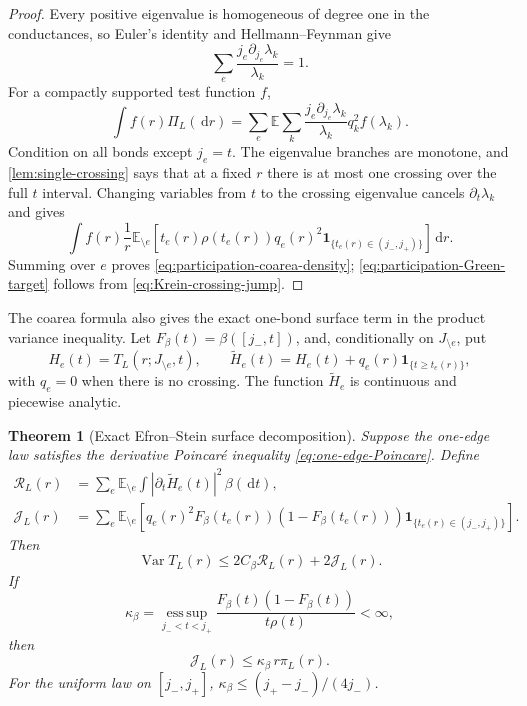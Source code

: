 \documentclass[11pt]{article}
\newtheorem{theorem}{Theorem}[section]
\theoremstyle{definition}
\theoremstyle{remark}
\newcommand{\E}{\mathbb E}
\newcommand{\Var}{\operatorname{Var}}
\newcommand{\abs}[1]{\left\lvert #1\right\rvert}
\newcommand{\dd}{\,\mathrm d}
\begin{document}
\begin{proof}
Every positive eigenvalue is homogeneous of degree one in the conductances, so
Euler's identity and Hellmann--Feynman give
\begin{equation}
 \sum_e\frac{j_e\partial_{j_e}\lambda_k}{\lambda_k}=1.
 \label{eq:eigenvalue-Euler-identity}
\end{equation}
For a compactly supported test function $f$,
\[
 \int f(r)\Pi_L(\dd r)
 =\sum_e\E\sum_k
 \frac{j_e\partial_{j_e}\lambda_k}{\lambda_k}
 q_k^2f(\lambda_k).
\]
Condition on all bonds except $j_e=t$.  The eigenvalue branches are monotone,
and \cref{lem:single-crossing} says that at a fixed $r$ there is at most one
crossing over the full $t$ interval.  Changing variables from $t$ to the
crossing eigenvalue cancels $\partial_t\lambda_k$ and gives
\[
 \int f(r)\frac1r\E_{\setminus e}
 \left[t_e(r)\rho(t_e(r))q_e(r)^2
 \bm1_{\{t_e(r)\in(j_-,j_+)\}}\right]\dd r.
\]
Summing over $e$ proves \eqref{eq:participation-coarea-density};
\eqref{eq:participation-Green-target} follows from
\eqref{eq:Krein-crossing-jump}.
\end{proof}

The coarea formula also gives the exact one-bond surface term in the product
variance inequality.  Let $F_\beta(t)=\beta([j_-,t])$, and, conditionally on
$J_{\setminus e}$, put
\begin{equation}
 H_e(t)=T_L(r;J_{\setminus e},t),
 \qquad
 \widetilde H_e(t)=H_e(t)+q_e(r)\bm1_{\{t\ge t_e(r)\}},
 \label{eq:regularized-one-edge-sharp-path}
\end{equation}
with $q_e=0$ when there is no crossing.  The function $\widetilde H_e$ is
continuous and piecewise analytic.

\begin{theorem}[Exact Efron--Stein surface decomposition]
\label{thm:Efron-Stein-surface-decomposition}
Suppose the one-edge law satisfies the derivative Poincar\'e inequality
\eqref{eq:one-edge-Poincare}.  Define
\begin{align}
 \mathcal R_L(r)
 &=\sum_e\E_{\setminus e}\int
 \abs{\partial_t\widetilde H_e(t)}^2\,\beta(\dd t),
 \label{eq:regular-one-edge-sensitivity}\\
 \mathcal J_L(r)
 &=\sum_e\E_{\setminus e}\left[
 q_e(r)^2F_\beta(t_e(r))(1-F_\beta(t_e(r)))
 \bm1_{\{t_e(r)\in(j_-,j_+)\}}
 \right].
 \label{eq:jump-one-edge-sensitivity}
\end{align}
Then
\begin{equation}
 \boxed{
 \Var T_L(r)\le2C_\beta\mathcal R_L(r)+2\mathcal J_L(r).}
 \label{eq:Efron-Stein-surface-bound}
\end{equation}
If
\begin{equation}
 \kappa_\beta=
 \operatorname*{ess\,sup}_{j_-<t<j_+}
 \frac{F_\beta(t)(1-F_\beta(t))}{t\rho(t)}<\infty,
 \label{eq:one-edge-isoperimetric-ratio}
\end{equation}
then
\begin{equation}
 \boxed{\mathcal J_L(r)\le\kappa_\beta\,r\pi_L(r).}
 \label{eq:jump-participation-density-bound}
\end{equation}
For the uniform law on $[j_-,j_+]$,
$\kappa_\beta\le(j_+-j_-)/(4j_-)$.
\end{theorem}
\end{document}

